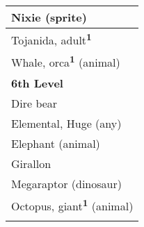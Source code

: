 \begin{longtable}{ll}
\hline
\multicolumn{2}{|p{3.857in}|}{\begin{minipage}[t]{3.857in}\raggedright
Nixie (sprite)\end{minipage}}\\
\hline
\multicolumn{2}{|p{3.857in}|}{\begin{minipage}[t]{3.857in}\raggedright
Tojanida, adult\textsuperscript{\textbf{1}}\end{minipage}}\\
\hline
\multicolumn{2}{|p{3.857in}|}{\begin{minipage}[t]{3.857in}\raggedright
Whale, orca\textsuperscript{\textbf{1}}\textbf{} (animal)\end{minipage}}\\
\hline
\multicolumn{2}{|p{3.857in}|}{\begin{minipage}[t]{3.857in}\raggedright
\textbf{6th Level}\end{minipage}}\\
\hline
\multicolumn{2}{|p{3.857in}|}{\begin{minipage}[t]{3.857in}\raggedright
Dire bear\end{minipage}}\\
\hline
\multicolumn{2}{|p{3.857in}|}{\begin{minipage}[t]{3.857in}\raggedright
Elemental, Huge (any)\end{minipage}}\\
\hline
\multicolumn{2}{|p{3.857in}|}{\begin{minipage}[t]{3.857in}\raggedright
Elephant (animal)\end{minipage}}\\
\hline
\multicolumn{2}{|p{3.857in}|}{\begin{minipage}[t]{3.857in}\raggedright
Girallon\end{minipage}}\\
\hline
\multicolumn{2}{|p{3.857in}|}{\begin{minipage}[t]{3.857in}\raggedright
Megaraptor (dinosaur)\end{minipage}}\\
\hline
\multicolumn{2}{|p{3.857in}|}{\begin{minipage}[t]{3.857in}\raggedright
Octopus, giant\textsuperscript{\textbf{1}}\textbf{} (animal)\end{minipage}}\\
\hline
\multicolumn{2}{|p{3.857in}|}{\begin{minipage}[t]{3.857in}\raggedright

\end{minipage}}
\end{longtable}
